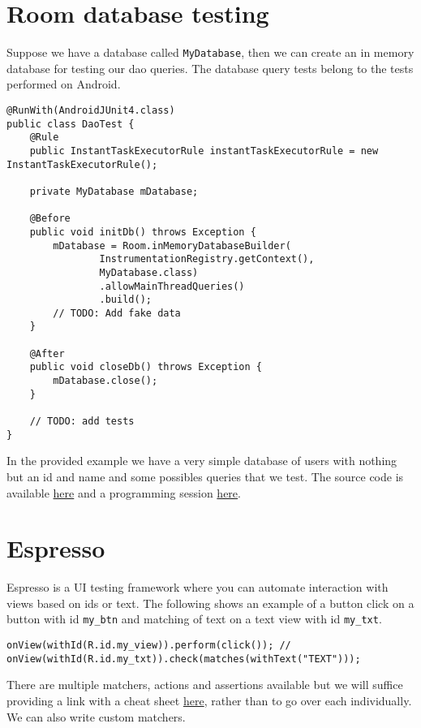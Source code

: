 \section{Room database testing}
Suppose we have a database called \texttt{MyDatabase}, then we can create an in memory database for testing our dao queries. The database query tests belong to the tests performed on Android.
\begin{lstlisting}[style=A_Java]
@RunWith(AndroidJUnit4.class)
public class DaoTest {
    @Rule
    public InstantTaskExecutorRule instantTaskExecutorRule = new InstantTaskExecutorRule();

    private MyDatabase mDatabase;

    @Before
    public void initDb() throws Exception {
        mDatabase = Room.inMemoryDatabaseBuilder(
                InstrumentationRegistry.getContext(),
                MyDatabase.class)
                .allowMainThreadQueries()
                .build();
        // TODO: Add fake data
    }

    @After
    public void closeDb() throws Exception {
        mDatabase.close();
    }

    // TODO: add tests
}
\end{lstlisting}
In the provided example we have a very simple database of users with nothing but an id and name and some possibles queries that we test. The
source code is available \href{https://github.com/JonSteinn/AndroidDevelopment/tree/master/examples/lab6/roomtest}{here} and a programming session \href{TODO}{here}.

\section{Espresso}
Espresso is a UI testing framework where you can automate interaction with views based on ids or text. The following shows an example of a button click on a button with id \texttt{my\_btn} and matching of text on a text view with id \texttt{my\_txt}.
\begin{lstlisting}[style=A_Java]
onView(withId(R.id.my_view)).perform(click()); // 
onView(withId(R.id.my_txt)).check(matches(withText("TEXT")));
\end{lstlisting}
There are multiple matchers, actions and assertions available but we will suffice providing a link with a cheat sheet \href{https://google.github.io/android-testing-support-library/downloads/espresso-cheat-sheet-2.1.0.pdf}{here}, rather than to go over each individually. We can also write custom matchers.\\

